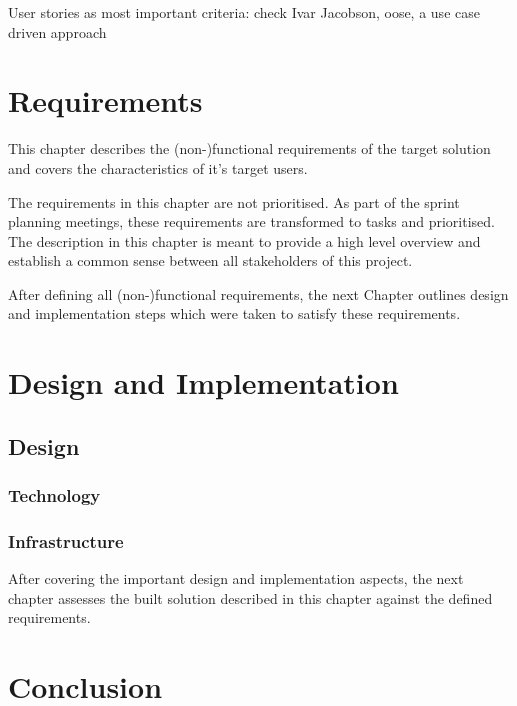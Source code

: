 \documentclass[hsr-ba,english]{hgbthesis}
\begin{document}
User stories as most important criteria: check Ivar Jacobson, oose, a use case driven approach



\chapter{Requirements}
\label{cha:requirements}

This chapter describes the (non-)functional requirements of the target solution and covers the characteristics of it's target users. 

The requirements in this chapter are not prioritised. As part of the sprint planning meetings, these requirements are transformed to tasks and prioritised. The description in this chapter is meant to provide a high level overview and establish a common sense between all stakeholders of this project.






\bigskip

After defining all (non-)functional requirements, the next Chapter outlines design and implementation steps which were taken to satisfy these requirements.


\chapter{Design and Implementation}
\label{cha:implementation}


\section{Design} 


\subsection{Technology}


\subsection{Infrastructure}



\bigskip
After covering the important design and implementation aspects, the next chapter assesses the built solution described in this chapter against the defined requirements.

\chapter{Conclusion}
\end{document}
